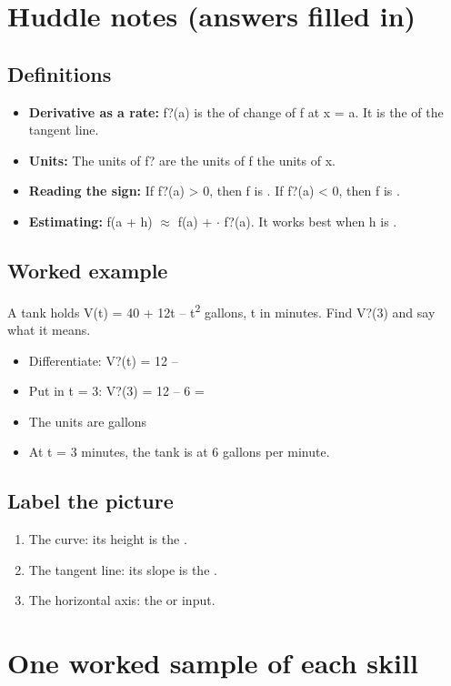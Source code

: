 \documentclass[11pt]{article}
\begin{document}
\section*{Huddle notes (answers filled in)}
\subsection*{Definitions}\begin{itemize}
\item \textbf{Derivative as a rate:} f?(a) is the  of change of f at x = a. It is the  of the tangent line.
\item \textbf{Units:} The units of f? are the units of f  the units of x.
\item \textbf{Reading the sign:} If f?(a) > 0, then f is . If f?(a) < 0, then f is .
\item \textbf{Estimating:} f(a + h) $\approx$ f(a) +  $\cdot$ f?(a). It works best when h is .
\end{itemize}
\subsection*{Worked example}
A tank holds V(t) = 40 + 12t -- t\textsuperscript{2} gallons, t in minutes. Find V?(3) and say what it means.\\
\begin{itemize}
\item Differentiate: V?(t) = 12 -- 
\item Put in t = 3: V?(3) = 12 -- 6 = 
\item The units are gallons 
\item At t = 3 minutes, the tank is  at 6 gallons per minute.
\end{itemize}
\subsection*{Label the picture}
\begin{enumerate}
\item The curve: its height is the .
\item The tangent line: its slope is the .
\item The horizontal axis: the  or input.
\end{enumerate}
\section*{One worked sample of each skill}
\end{document}
